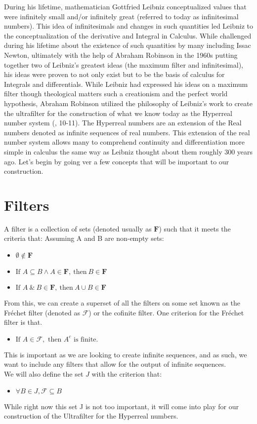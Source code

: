 \documentclass[12pt]{report}
\begin{document}
During his lifetime, mathematician Gottfried Leibniz conceptualized values that were infinitely small and/or infinitely great (referred to today as infinitesimal numbers). 
This idea of infinitesimals and changes in such quantities led Leibniz to the conceptualization of the derivative and Integral in Calculus. 
While challenged during his lifetime about the existence of such quantities by many including Issac Newton, ultimately with the help of Abraham Robinson in the 1960s putting together two of Leibniz's greatest ideas (the maximum filter and infinitesimal), his ideas were proven to not only exist but to be the basis of calculus for Integrals and differentials. 
While Leibniz had expressed his ideas on a maximum filter though theological matters such a creationism and the perfect world hypothesis, Abraham Robinson utilized the philosophy of Leibniz's work to create the ultrafilter for the construction of what we know today as the Hyperreal number system (\citeauthor{Goldblatt}, 10-11). 
The Hyperreal numbers are an extension of the Real numbers denoted as infinite sequences of real numbers. 
This extension of the real number system allows many to comprehend continuity and differentiation more simple in calculus the same way as Leibniz thought about them roughly 300 years ago.
Let's begin by going ver a few concepts that will be important to our construction.

\section*{Filters}
A filter is a collection of sets (denoted usually as $\mathbf{F}$) such that it meets the criteria that:
Assuming A and B are non-empty sets:
\begin{itemize}
    \item $\emptyset \not\in \mathbf{F}$
    \item $\text{If }  A \subseteq B \land A  \in \mathbf{F} ,\ \text{then} \ B \in \mathbf{F} $
    \item $\text{If }  A \ \& \ B  \in \mathbf{F} ,\ \text{then}  \ A \cup B \in \mathbf{F} $
\end{itemize}
From this, we can create a superset of all the filters on some set known as the Fr\'echet filter (denoted as $\mathcal{F}$) or the cofinite filter.
One criterion for the Fr\'echet filter is that.
\begin{itemize}
    \item $\text{If } A \in \mathcal{F}, \text{ then } A^c \text{ is finite.}$
\end{itemize}
This is important as we are looking to create infinite sequences, and as such, we want to include any filters that allow for the output of infinite sequences.\\
We will also define the set $J$ with the criterion that:
\begin{itemize}
    \item $\forall B \in J, \mathcal{F} \subseteq B$
\end{itemize}
While right now this set J is not too important, it will come into play for our construction of the Ultrafilter for the Hyperreal numbers.
\end{document}
